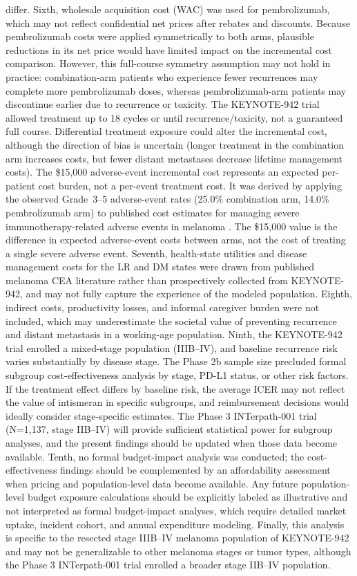 \documentclass[12pt,a4paper]{article}
\begin{document}
differ. Sixth, wholesale acquisition cost (WAC) was used for \mbox{pembrolizumab}, which may not reflect confidential net prices after rebates and discounts. Because \mbox{pembrolizumab} costs were applied symmetrically to both arms, plausible reductions in its net price would have limited impact on the incremental cost comparison. However, this full-course symmetry assumption may not hold in practice: combination-arm patients who experience fewer recurrences may complete more pembrolizumab doses, whereas pembrolizumab-arm patients may discontinue earlier due to recurrence or toxicity. The KEYNOTE-942 trial allowed treatment up to 18 cycles or until recurrence/toxicity, not a guaranteed full course. Differential treatment exposure could alter the incremental cost, although the direction of bias is uncertain (longer treatment in the combination arm increases costs, but fewer distant metastases decrease lifetime management costs). The \$15,000 adverse-event incremental cost represents an expected per-patient cost burden, not a per-event treatment cost. It was derived by applying the observed Grade~3--5 adverse-event rates (25.0\% combination arm, 14.0\% pembrolizumab arm) to published cost estimates for managing severe immunotherapy-related adverse events in melanoma \cite{bensimon2019,zhang2023}. The \$15,000 value is the difference in expected adverse-event costs between arms, not the cost of treating a single severe adverse event. Seventh, health-state utilities and disease management costs for the LR and DM states were drawn from published melanoma CEA literature rather than prospectively collected from \mbox{KEYNOTE-942}, and may not fully capture the experience of the modeled population. Eighth, indirect costs, productivity losses, and informal caregiver burden were not included, which may underestimate the societal value of preventing recurrence and distant metastasis in a working-age population. Ninth, the \mbox{KEYNOTE-942} trial enrolled a mixed-stage population (IIIB--IV), and baseline recurrence risk varies substantially by disease stage. The Phase 2b sample size precluded formal subgroup cost-effectiveness analysis by stage, PD-L1 status, or other risk factors. If the treatment effect differs by baseline risk, the average ICER may not reflect the value of intismeran in specific subgroups, and reimbursement decisions would ideally consider stage-specific estimates. The Phase 3 \mbox{INTerpath-001} trial (N=1,137, stage IIB--IV) will provide sufficient statistical power for subgroup analyses, and the present findings should be updated when those data become available. Tenth, no formal budget-impact analysis was conducted; the cost-effectiveness findings should be complemented by an affordability assessment when pricing and population-level data become available. Any future population-level budget exposure calculations should be explicitly labeled as illustrative and not interpreted as formal budget-impact analyses, which require detailed market uptake, incident cohort, and annual expenditure modeling. Finally, this analysis is specific to the resected stage IIIB--IV melanoma population of \mbox{KEYNOTE-942} and may not be generalizable to other melanoma stages or tumor types, although the Phase 3 \mbox{INTerpath-001} trial enrolled a broader stage IIB--IV population.
\end{document}
